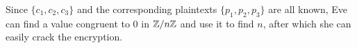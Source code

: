 \begin{problem}
\begin{enumerate}
\begin{Answer}
\noindent
Since $\{c_1, c_2, c_3\}$ and the corresponding plaintexts $\{p_1, p_2, p_3\}$ are all known,
Eve can find a value congruent to $0$ in $\mathbb{Z}/n\mathbb{Z}$ and use it to find $n$,
after which she can easily crack the encryption.

\end{Answer}
\end{enumerate}
\end{problem}

